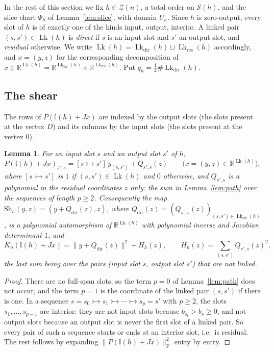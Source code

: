 \documentclass[11pt,a4paper]{article}
\newtheorem{lemma}[theorem]{Lemma}
\theoremstyle{definition}
\theoremstyle{remark}
\numberwithin{equation}{section}
\newcommand{\R}{\mathbb{R}}
\newcommand{\Fr}[1]{\lVert #1\rVert_{\mathrm F}}
\newcommand{\norm}[1]{\lVert #1\rVert}
\newcommand{\Zb}{\mathcal Z}
\newcommand{\I}{\mathbb I}
\newcommand{\lin}{\rightarrowtail}
\newcommand{\Sl}{\mathcal S}
\newcommand{\Lk}{\operatorname{Lk}}
\begin{document}
In the rest of this section we fix $h\in\Zb(n)$, a total order on $\Sl(h)$, and the slice chart $\Psi_h$ of Lemma~\ref{lem:slice}, with domain $U_h$. Since $h$ is zero-output, every slot of $h$ is of exactly one of the kinds input, output, interior. A linked pair $(s,s')\in\Lk(h)$ is \emph{direct} if $s$ is an input slot and $s'$ an output slot, and \emph{residual} otherwise. We write $\Lk(h)=\Lk_{\mathrm{dir}}(h)\sqcup\Lk_{\mathrm{res}}(h)$ accordingly, and $x=(y,z)$ for the corresponding decomposition of $x\in\R^{\Lk(h)}=\R^{\Lk_{\mathrm{dir}}(h)}\times\R^{\Lk_{\mathrm{res}}(h)}$. Put $q_h=\tfrac12\#\Lk_{\mathrm{dir}}(h)$.

\subsection{The shear}
The rows of $P(\I(h)+Jx)$ are indexed by the output slots (the slots present at the vertex $D$) and its columns by the input slots (the slots present at the vertex $0$).

\begin{lemma}\label{lem:shear}
For an input slot $s$ and an output slot $s'$ of $h$,
\[
P(\I(h)+Jx)_{s',s}=[s\lin s']\,y_{(s,s')}+Q_{s',s}(z)\qquad\bigl(x=(y,z)\in\R^{\Lk(h)}\bigr),
\]
where $[s\lin s']$ is $1$ if $(s,s')\in\Lk(h)$ and $0$ otherwise, and $Q_{s',s}$ is a polynomial in the residual coordinates $z$ only: the sum in Lemma~\ref{lem:path} over the sequences of length $p\ge2$. Consequently the map $\mathrm{Sh}_h(y,z)=(y+Q_{\mathrm{dir}}(z),z)$, where $Q_{\mathrm{dir}}(z)=(Q_{s',s}(z))_{(s,s')\in\Lk_{\mathrm{dir}}(h)}$, is a polynomial automorphism of $\R^{\Lk(h)}$ with polynomial inverse and Jacobian determinant $1$, and
\[
K_n(\I(h)+Jx)=\norm{y+Q_{\mathrm{dir}}(z)}^2+H_h(z),\qquad H_h(z)=\sum_{(s,s')}Q_{s',s}(z)^2,
\]
the last sum being over the pairs (input slot $s$, output slot $s'$) that are not linked.
\end{lemma}
\begin{proof}
There are no full-span slots, so the term $p=0$ of Lemma~\ref{lem:path} does not occur, and the term $p=1$ is the coordinate of the linked pair $(s,s')$ if there is one. In a sequence $s=s_0\lin s_1\lin\cdots\lin s_p=s'$ with $p\ge2$, the slots $s_1,\dots,s_{p-1}$ are interior: they are not input slots because $b_{s_l}>b_s\ge0$, and not output slots because an output slot is never the first slot of a linked pair. So every pair of such a sequence starts or ends at an interior slot, i.e.\ is residual. The rest follows by expanding $\Fr{P(\I(h)+Jx)}^2$ entry by entry.
\end{proof}
\end{document}
